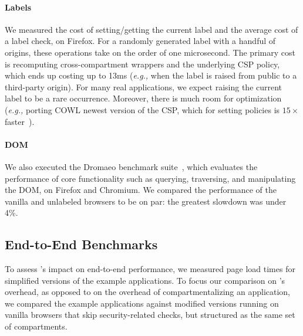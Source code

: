 \paragraph{Labels} We measured the cost of setting/getting the current
label and the average cost of a label check, on Firefox.
%
For a randomly generated label with a handful of origins, these
operations take on the order of one microsecond.
%
The primary cost is recomputing cross-compartment wrappers and
the underlying CSP policy, which ends up costing up to 13ms (\emph{e.g.,} when
the label is raised from public to a third-party origin).
%
For many real applications, we expect raising the current label
to be a rare occurrence.
%
Moreover, there is much room for optimization (\emph{e.g.,}
porting COWL newest version of the CSP, which for
setting policies is $15\times$ faster~\cite{faster-csp}).
 
\paragraph{DOM} We also executed the Dromaeo benchmark suite~\cite{dromaeo},
which evaluates the performance of core functionality such as
querying, traversing, and manipulating the DOM, on Firefox and
Chromium. We compared the performance of the vanilla and unlabeled
browsers to be on par: the greatest slowdown was under 4\%.

\subsection{End-to-End Benchmarks}
\label{sec:eval:macro}

To assess \sys{}'s impact on end-to-end performance, we measured
page load times for simplified versions of the example applications.
%
To focus our comparison on \sys{}'s overhead, as opposed to on the
overhead of compartmentalizing an application, we compared the example
applications against modified versions running on vanilla browsers
that skip security-related checks, but structured as the same set of
compartments.
%

